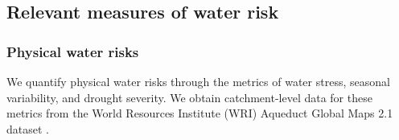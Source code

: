 \documentclass[a4paper]{article}
\begin{document}


\subsection{Relevant measures of water risk} \label{sec:metrics}

\subsubsection{Physical water risks}
We quantify physical water risks through the metrics of water stress, seasonal variability, and drought severity.
We obtain catchment-level data for these metrics from the World Resources Institute (WRI) Aqueduct Global Maps 2.1 dataset \citep{Gassert:2014}.

\end{document}

